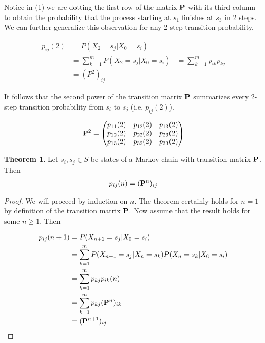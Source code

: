 \documentclass[a4paper,12pt]{article}
\theoremstyle{definition}
\newtheorem{theorem}{Theorem}[subsection]
\let\oldtextbf\mathbf
\renewcommand{\mathbf}[1]{\oldtextbf{\boldmath #1}}
\begin{document}
	Notice in (1) we are dotting the first row of the matrix $\mathbf{P}$ with its third column to obtain the probability 
	that the process starting at $s_1$ finishes at $s_3$ in 2 steps. We can further generalize this observation for any 2-step 
	transition probability.

	\begin{equation*}
		\begin{aligned}
			p_{ij}(2) &= P(X_2 = s_j|X_0 = s_i) \\ 
					&= \sum_{k=1}^{m} P(X_2 = s_j|X_0 = s_i)
					&= \sum_{k=1}^{m} p_{ik}p_{kj}\\
					&= (P^2)_{ij}
		\end{aligned}
	\end{equation*}	    

	It follows that the second power of the transition matrix $\mathbf{P}$ summarizes every 2-step transition probability 
	from $s_i$ to $s_j$ (i.e. $p_{ij}(2)$).

	\begin{equation*}
		\begin{aligned}
			\mathbf{P}^2 =
			\begin{pmatrix}
				p_{11}(2) & p_{12}(2) & p_{13}(2) \\
				p_{12}(2) & p_{22}(2) & p_{23}(2) \\
				p_{13}(2) & p_{32}(2) & p_{33}(2) \\
			\end{pmatrix}
		\end{aligned}
	\end{equation*}

	\begin{theorem}
		Let $s_i, s_j \in S$ be states of a Markov chain with transition matrix $\mathbf{P}$. Then
		\begin{equation*}
		\begin{aligned}
			p_{ij}(n) = (\mathbf{P}^n)_{ij}
		\end{aligned}
		\end{equation*}	
	\end{theorem}
	\begin{proof}
		We will proceed by induction on $n$. The theorem certainly holds for $n=1$ by definition of the transition matrix $\mathbf{P}$.
		Now assume that the result holds for some $n \geq 1$. Then

		\begin{equation*}
		\begin{aligned}
			p_{ij}(n+1) &= P(X_{n+1} = s_j|X_0 = s_i) \\
					&= \sum_{k=1}^{m} P(X_{n+1} = s_j|X_{n} = s_k)P(X_{n} = s_k | X_0 = s_i) \\
					&= \sum_{k=1}^{m} p_{kj}p_{ik}(n) \\
					&= \sum_{k=1}^{m} p_{kj}(\mathbf{P}^{n})_{ik} \\
					&= (\mathbf{P}^{n+1})_{ij} 
		\end{aligned}
		\end{equation*}	
	\end{proof}
	
\end{document}
